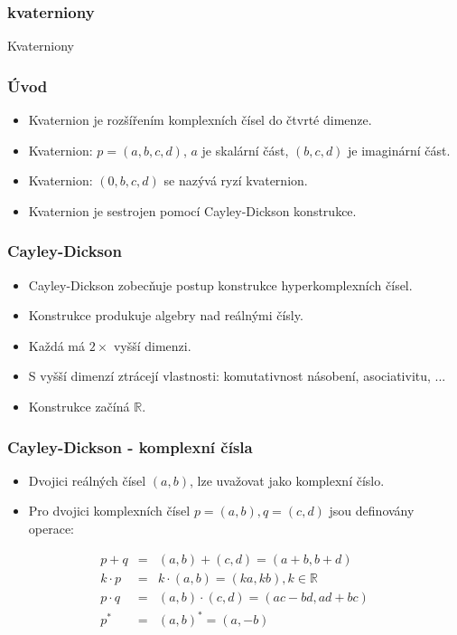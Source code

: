 \begin{frame}
\frametitle{kvaterniony}
\begin{center}
\Huge {\color{white}Kvaterniony}
\end{center}
\end{frame}


\begin{frame}
\frametitle{Úvod}
	\begin{itemize}
	\item Kvaternion je rozšířením komplexních čísel do čtvrté dimenze.
	\item Kvaternion: $p=(a,b,c,d)$, $a$ je skalární část, $(b,c,d)$ je imaginární část.
	\item Kvaternion: $(0,b,c,d)$ se nazývá ryzí kvaternion.
	\item Kvaternion je sestrojen pomocí Cayley-Dickson konstrukce.
	\end{itemize}
\end{frame}

\begin{frame}
\frametitle{Cayley-Dickson}
	\begin{itemize}
	\item Cayley-Dickson zobecňuje postup konstrukce hyperkomplexních čísel.
	\item Konstrukce produkuje algebry nad reálnými čísly.
	\item Každá má $2\times$ vyšší dimenzi.
	\item S vyšší dimenzí ztrácejí vlastnosti: komutativnost násobení, asociativitu, ...
	\item Konstrukce začíná $\mathbb{R}$.
	\end{itemize}
\end{frame}

\begin{frame}
\frametitle{Cayley-Dickson - komplexní čísla}
	\begin{itemize}
	\item Dvojici reálných čísel $(a,b)$, lze uvažovat jako komplexní číslo.
	\item Pro dvojici komplexních čísel $p=(a,b),q=(c,d)$ jsou definovány operace:
	\end{itemize} 
\begin{eqnarray*}
p+q&=& (a,b)+(c,d)=(a+b,b+d)\\
k\cdot p &=& k\cdot (a,b)=(ka,kb),k \in \mathbb{R}\\
p\cdot q &=& (a,b) \cdot (c,d) = (ac-bd,ad+bc)\\
p^*&=&(a,b)^*=(a,-b)
\end{eqnarray*}
\end{frame}

